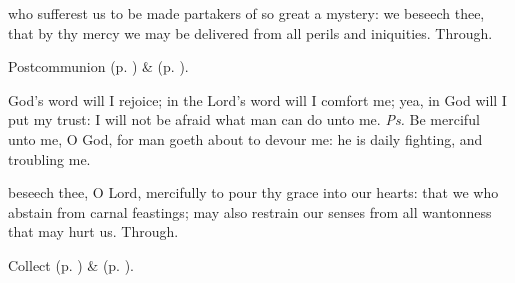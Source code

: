\postcommunion
{} who sufferest us to be made partakers of so great a mystery: we beseech thee, that by thy mercy we may be delivered from all perils and iniquities. Through.
\begin{rubric}
     Postcommunion  (p. \pageref{AshWednesdayMassPostcommunion}) \&   (p. \pageref{SPLivingDeparted}).
\end{rubric}


\clearpage
{}
\introit
{} God's word will I rejoice; in the Lord's word will I comfort me; yea, in God will I put my trust: I will not be afraid what man can do unto me. \textit{Ps.} Be merciful unto me, O God, for man goeth about to devour me: he is daily fighting, and troubling me.


\collect
{} beseech thee, O Lord, mercifully to pour thy grace into our hearts: that we who abstain from carnal feastings; may also restrain our senses from all wantonness that may hurt us. Through.
\begin{rubric}
     Collect  (p. \pageref{AshWednesdayMassCollect}) \&   (p. \pageref{SPLivingDeparted}).
\end{rubric}

